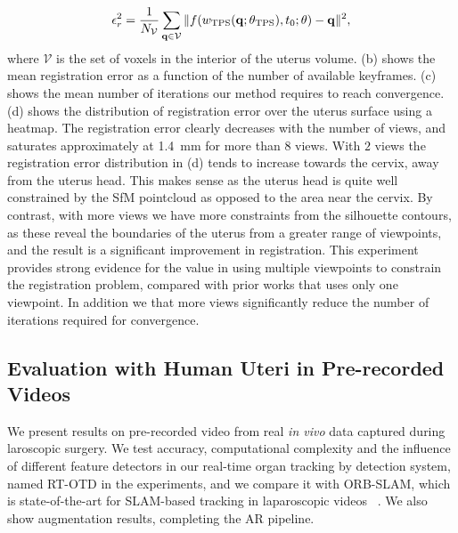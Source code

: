 \begin{equation}
  \label{eq:regerror}
  \epsilon^2_r=\frac{1}{N_{\mathcal{V}}}\sum_{\mathbf{q}\in \mathcal{V}} \|f(\wTPS(\mathbf{q};\thetaTPS),t_0;\theta)-\mathbf{q}\|^2,
\end{equation}
where $\mathcal{V}$ is the set of voxels in the interior of the uterus volume.
(b) shows the mean registration error as a function of the number of available keyframes. (c) shows the mean number of iterations our method requires to reach convergence. (d) shows the distribution of registration error over the uterus surface using a heatmap. The registration error clearly decreases with the number of views, and saturates approximately at \SI{1.4}{\milli\metre} for more than $8$ views. With $2$ views the registration error distribution in (d) tends to increase towards the cervix, away from the uterus head. This makes sense as the uterus head is quite well constrained by the SfM pointcloud as opposed to the area near the cervix.
By contrast, with more views we have more constraints from the silhouette contours, as these reveal the boundaries of the uterus from a greater range of viewpoints, and the result is a significant improvement in registration. This experiment provides strong evidence for the value in using multiple viewpoints to constrain the registration problem, compared with prior works that uses only one viewpoint. In addition we that more views significantly reduce the number of iterations required for convergence.
\subsection{Evaluation with Human Uteri in Pre-recorded Videos}
\label{sec:orbslam}
We present results on pre-recorded video from real \emph{in vivo} data captured during laroscopic surgery. We test accuracy, computational complexity and the influence of different feature detectors in our real-time organ tracking by detection system, named RT-OTD in the experiments, and we compare it with ORB-SLAM, which is state-of-the-art for SLAM-based tracking in laparoscopic videos ~\cite{orbslam_laparo}. We also show augmentation results, completing the AR pipeline.
